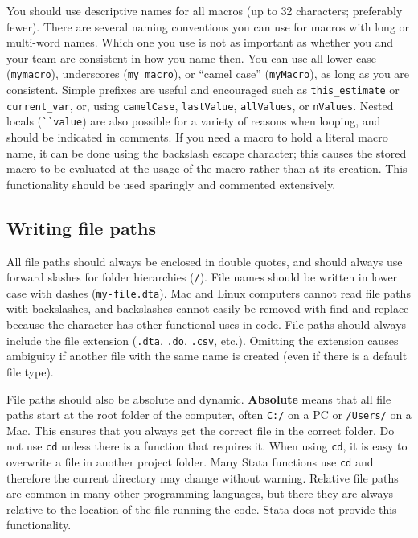 You should use descriptive names for all macros (up to 32 characters; preferably fewer).
There are several naming conventions you can use for macros with long or multi-word names.
Which one you use is not as important as whether you and your team are consistent in how you name then.
You can use all lower case (\texttt{mymacro}), underscores (\texttt{my\_macro}),
or ``camel case'' (\texttt{myMacro}), as long as you are consistent.
Simple prefixes are useful and encouraged such as \texttt{this\_estimate} or \texttt{current\_var},
or, using \texttt{camelCase}, \texttt{lastValue}, \texttt{allValues}, or \texttt{nValues}.
Nested locals (\texttt{\`{}\`{}value\textquotesingle\textquotesingle})
are also possible for a variety of reasons when looping, and should be indicated in comments.
If you need a macro to hold a literal macro name,
it can be done using the backslash escape character;
this causes the stored macro to be evaluated
at the usage of the macro rather than at its creation.
This functionality should be used sparingly and commented extensively.


\subsection{Writing file paths}

All file paths should always be enclosed in double quotes,
and should always use forward slashes for folder hierarchies (\texttt{/}).
File names should be written in lower case with dashes (\texttt{my-file.dta}).
Mac and Linux computers cannot read file paths with backslashes,
and backslashes cannot easily be removed with find-and-replace
because the character has other functional uses in code.
File paths should always include the file extension
(\texttt{.dta}, \texttt{.do}, \texttt{.csv}, etc.).
Omitting the extension causes ambiguity
if another file with the same name is created
(even if there is a default file type).

File paths should also be absolute and dynamic.
\textbf{Absolute} means that all
file paths start at the root folder of the computer,
often \texttt{C:/} on a PC or \texttt{/Users/} on a Mac.
This ensures that you always get the correct file in the correct folder.
Do not use \texttt{cd} unless there is a function that requires it.
When using \texttt{cd}, it is easy to overwrite a file in another project folder.
Many Stata functions use \texttt{cd} and therefore the current directory may change without warning.
Relative file paths are common in many other programming languages,
but there they are always relative to the location of the file running the code.
Stata does not provide this functionality.

